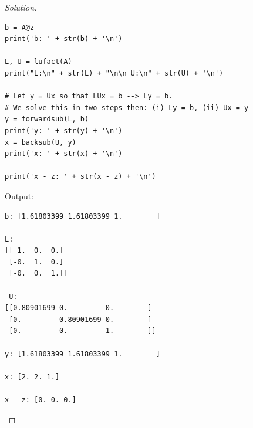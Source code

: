 \documentclass{article}
\theoremstyle{definition}
\begin{document}
\begin{proof}[Solution]
\begin{lstlisting}
b = A@z
print('b: ' + str(b) + '\n')

L, U = lufact(A)
print("L:\n" + str(L) + "\n\n U:\n" + str(U) + '\n')

# Let y = Ux so that LUx = b --> Ly = b.
# We solve this in two steps then: (i) Ly = b, (ii) Ux = y
y = forwardsub(L, b)
print('y: ' + str(y) + '\n')
x = backsub(U, y)
print('x: ' + str(x) + '\n')

print('x - z: ' + str(x - z) + '\n')

\end{lstlisting}
Output:
\begin{verbatim}
b: [1.61803399 1.61803399 1.        ]

L:
[[ 1.  0.  0.]
 [-0.  1.  0.]
 [-0.  0.  1.]]

 U:
[[0.80901699 0.         0.        ]
 [0.         0.80901699 0.        ]
 [0.         0.         1.        ]]

y: [1.61803399 1.61803399 1.        ]

x: [2. 2. 1.]

x - z: [0. 0. 0.]
\end{verbatim}
\end{proof}
\end{document}
